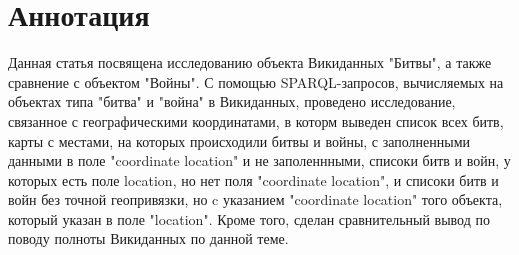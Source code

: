 \section{Аннотация}

Данная статья посвящена исследованию объекта Викиданных "Битвы", а также сравнение с объектом "Войны". С помощью SPARQL-запросов, вычисляемых на объектах типа "битва" и "война" в Викиданных, проведено исследование, связанное с географическими координатами, в которм выведен список всех битв, карты с местами, на которых происходили битвы и войны, с заполненными данными в поле "coordinate location" и не заполеннными, списоки битв и войн, у которых есть поле location, но нет поля "coordinate location", и списоки битв и войн без точной геопривязки, но c указанием "coordinate location" того объекта, который указан в поле "location". Кроме того, сделан сравнительный вывод по поводу полноты Викиданных по данной теме.